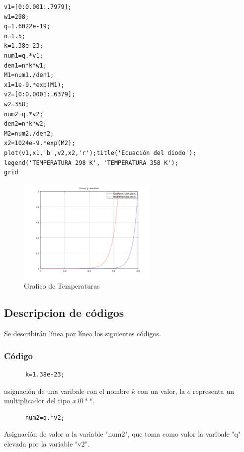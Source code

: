 \documentclass[]{article}
\begin{document}
 \begin{verbatim}
v1=[0:0.001:.7979];
w1=298;
q=1.6022e-19;
n=1.5;
k=1.38e-23;
num1=q.*v1;
den1=n*k*w1;
M1=num1./den1;
x1=1e-9.*exp(M1);
v2=[0:0.0001:.6379];
w2=358;
num2=q.*v2;
den2=n*k*w2;
M2=num2./den2;
x2=1024e-9.*exp(M2);
plot(v1,x1,'b',v2,x2,'r');title('Ecuación del diodo'); 
legend('TEMPERATURA 298 K', 'TEMPERATURA 358 K');
grid 
 \end{verbatim}
 
 \begin{figure}[h!]
 	\centering
 	\includegraphics[width=0.6\textwidth]{codigo1.png}
 	\caption{Grafico de Temperaturas}
 	\label{fig:codigo1}
 \end{figure}

\subsection{Descripcion de códigos}

Se describirán línea por línea los siguientes códigos.\\

\subsubsection{Código}

	  \begin{verbatim}
	  k=1.38e-23;
	  \end{verbatim}
	  
	  asignación de una varibale con el nombre $k$ con un valor, la $e$ representa un multiplicador del tipo $x10**$.\\
	  
	  \begin{verbatim}
	  num2=q.*v2;
	   \end{verbatim}
	   
	   Asignación de valor a la variable "num2", que toma como valor la varibale "q" elevada por la variable "v2".\\
	   
\end{document}
